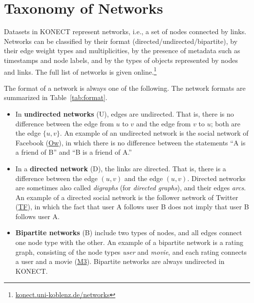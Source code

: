 \documentclass{article}
\begin{document}
\section{Taxonomy of Networks}
\label{sec:taxonomy}
Datasets in KONECT represent networks, i.e., a set of nodes connected by
links. Networks can be classified by their format
(directed/undirected/bipartite), by their edge weight types and
multiplicities, by the 
presence of metadata such as timestamps and node labels, and by
the types of objects represented by nodes and links. 
The full list of networks is given online.\footnote{\href{http://konect.uni-koblenz.de/networks/}{konect.uni-koblenz.de/networks}}

The format of a network is always one of the following.  The network
formats are summarized in Table~\ref{tab:format}. 
\begin{itemize}
\item 
  In \textbf{undirected networks} (U), 
  edges are undirected.  That is,
  there is no difference between the edge from $u$ to $v$ and the edge
  from $v$ to $u$; both are the edge $\{u,v\}$. 
  An example of an undirected network is the social network of
  Facebook
  (\href{http://konect.uni-koblenz.de/networks/facebook-wosn-wall}{\textsf{Ow}}),
  in which there is no difference between the statements ``A 
  is a friend of B'' and ``B is a friend of A.''
\item In a \textbf{directed network} (D), 
  the links are directed. That is, there is a
  difference between the edge $(u,v)$ and the edge $(u,v)$. 
  Directed networks are sometimes also called \emph{digraphs} (for \emph{directed
    graphs}), and their edges \emph{arcs}. 
  An example of a directed social network is the follower network of
  Twitter
  (\href{http://konect.uni-koblenz.de/networks/twitter_mpi}{\textsf{TF}}),
  in which the fact that user A follows user B does not imply 
  that user B follows user A. 
\item \textbf{Bipartite networks} (B) 
  include two types of nodes, and all edges
  connect one node type with the other. An example of a bipartite
  network is a rating graph, consisting of the node types \emph{user}
  and \emph{movie}, and each rating connects a user and a movie
  (\href{http://konect.uni-koblenz.de/networks/movielens-10m_rating}{\textsf{M3}}).  
  Bipartite networks are always undirected in KONECT. 
\end{itemize}
\end{document}
